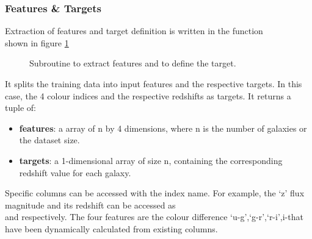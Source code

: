 \subsubsection{Features \& Targets}
Extraction of features and target definition is written in the function\\  shown in figure \ref{fig:gft0}
\begin{figure}[H]
	\centering
	\caption{Subroutine to extract features and to define the target.}
	\label{fig:gft0}
\end{figure}
It splits the training data into input features and the respective targets. In this case, the 4 colour indices and the respective redshifts as targets. It returns a tuple of:
\begin{itemize}
	\item \textbf{features}: a  array of n by 4 dimensions, where n is the number of galaxies or the dataset size.
	\item \textbf{targets}: a 1-dimensional  array of size n, containing the corresponding redshift value for each galaxy.
\end{itemize}

Specific columns can be accessed with the index name. For example, the `z' flux magnitude and its redshift can be accessed as\\  and respectively. The four features are the colour difference `u-g',`g-r',`r-i',i-that have been dynamically calculated from existing columns.

